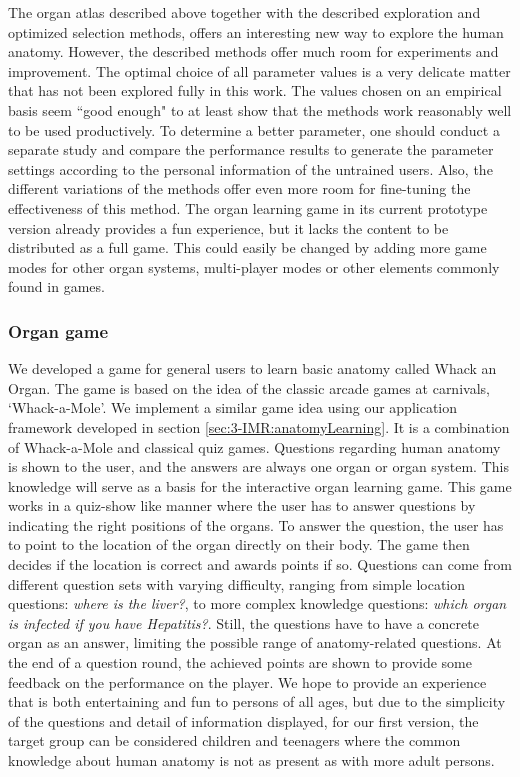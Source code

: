 The organ atlas described above together with the described exploration and optimized selection methods, offers an interesting new way to explore the human anatomy. However, the described methods offer much room for experiments and improvement. The optimal choice of all parameter values is a very delicate matter that has not been explored fully in this work. The values chosen on an empirical basis seem ``good enough" to at least show that the methods work reasonably well to be used productively. To determine a better parameter, one should conduct a separate study and compare the performance results to generate the parameter settings according to the personal information of the untrained users. Also, the different variations of the methods offer even more room for fine-tuning the effectiveness of this method. 
The organ learning game in its current prototype version already provides a fun experience, but it lacks the content to be distributed as a full game. This could easily be changed by adding more game modes for other organ systems, multi-player modes or other elements commonly found in games.

\subsubsection{Organ game}
We developed a game for general users to learn basic anatomy called Whack an Organ. The game is based on the idea of the classic arcade games at carnivals, `Whack-a-Mole'. We implement a similar game idea using our application framework developed in section \ref{sec:3-IMR:anatomyLearning}. It is a combination of Whack-a-Mole and classical quiz games. Questions regarding human anatomy is shown to the user, and the answers are always one organ or organ system. This knowledge will serve as a basis for the interactive organ learning game. This game works in a quiz-show like manner where the user has to answer questions by indicating the right positions of the organs.
To answer the question, the user has to point to the location of the organ directly on their body. The game then decides if the location is correct and awards points if so. Questions can come from different question sets with varying difficulty, ranging from simple location questions: \textit{where is the liver?}, to more complex knowledge questions: \textit{which organ is infected if you have Hepatitis?}.
Still, the questions have to have a concrete organ as an answer, limiting the possible range of anatomy-related questions. At the end of a question round, the achieved points are shown to provide some feedback on the performance on the player.
We hope to provide an experience that is both entertaining and fun to persons of all ages, but due to the simplicity of the questions and detail of information displayed, for our first version, the target group can be considered children and teenagers where the common knowledge about human anatomy is not as present as with more adult persons.

